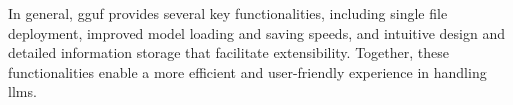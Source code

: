 In general, \gls{gguf} provides several key functionalities, including single file deployment, improved model loading and saving speeds, and intuitive design and detailed information storage that facilitate extensibility. Together, these functionalities enable a more efficient and user-friendly experience in handling \glspl{llm}.






